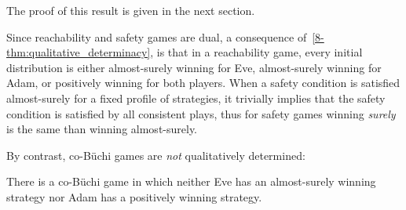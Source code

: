 The proof of this result is given in the next section.

Since reachability and safety games are dual, a consequence of~\cref{8-thm:qualitative_determinacy}, is that in a reachability game, every initial
distribution is either almost-surely winning for Eve,
almost-surely winning for Adam, or positively
winning for both players.
When a safety condition is satisfied almost-surely for a fixed profile of strategies,
it trivially implies that the safety condition is
satisfied by all consistent plays,
thus for safety games winning \emph{surely} is the same than winning almost-surely.



By contrast, co-B{\"u}chi games are \emph{not} qualitatively determined:
\begin{lemma}
There is a co-B{\"u}chi game in which neither Eve has an almost-surely winning strategy
nor Adam has a positively winning strategy.
\end{lemma}
